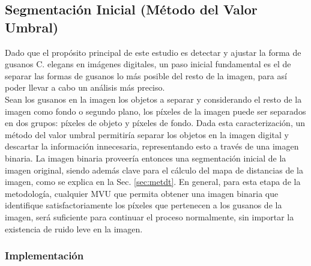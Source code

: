 \subsection{Segmentaci\'on Inicial (M\'etodo del Valor Umbral)}
\label{sec:metthres}

Dado que el prop\'osito principal de este estudio es detectar y ajustar la forma de 
gusanos C. elegans en im\'agenes digitales, un paso inicial fundamental es el de separar
las formas de gusanos lo m\'as posible del resto de la imagen, para as\'i poder llevar a
cabo un an\'alisis m\'as preciso.\\

Sean los gusanos en la imagen los objetos a separar y considerando el resto de la imagen
como fondo o segundo plano, los p\'ixeles de la imagen puede ser separados en dos grupos: 
p\'ixeles de objeto y p\'ixeles de fondo. Dada esta caracterizaci\'on, un m\'etodo del valor
umbral permitir\'ia separar los objetos en la imagen digital y descartar la informaci\'on
innecesaria, representando esto a trav\'es de una imagen binaria. La imagen binaria proveer\'ia
entonces una segmentaci\'on inicial de la imagen original, siendo adem\'as clave para el
c\'alculo del mapa de distancias de la imagen, como se explica en la Sec. \ref{sec:metdt}.
En general, para esta etapa de la metodolog\'ia, cualquier MVU que permita obtener una imagen
binaria que identifique satisfactoriamente los p\'ixeles que pertenecen a los gusanos de la
imagen, ser\'a suficiente para continuar el proceso normalmente, sin importar la existencia
de ruido leve en la imagen.


\subsubsection*{Implementaci\'on}
\label{sec:thresimp}

